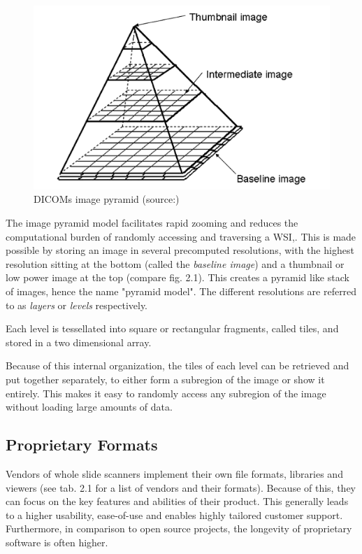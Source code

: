 \begin{figure}[H]
	\begin{center}
		\includegraphics[scale=0.2]{img/imgPyramid.png}
		\caption{DICOMs image pyramid (source:\cite{Singh11})}
		\label{fig:fig2.1}
	\end{center}
\end{figure}

The image pyramid model facilitates rapid zooming and reduces the computational burden of randomly accessing and traversing a WSI\cite{Singh11},\cite{Park12}. This is made possible by storing an image in several precomputed resolutions, with the highest resolution sitting at the bottom (called the \emph{baseline image}) and a thumbnail or low power image at the top (compare fig. 2.1)\cite{DICOM10}. This creates a pyramid like stack of images, hence the name "pyramid model". The different resolutions are referred to as \emph{layers}\cite{DICOM10} or \emph{levels}\cite{Singh11} respectively.

Each level is tessellated into square or rectangular fragments, called tiles, and stored in a two dimensional array\cite{Farahanil15}. 

Because of this internal organization, the tiles of each level can be retrieved and put together separately, to either form a subregion of the image or show it entirely. This makes it easy to randomly access any subregion of the image without loading large amounts of data\cite{Singh11}.


\subsection{Proprietary Formats}
Vendors of whole slide scanners implement their own file formats, libraries and viewers (see tab. 2.1 for a list of vendors and their formats). Because of this, they can focus on the key features and abilities of their product. This generally leads to a higher usability, ease-of-use and enables highly tailored customer support. Furthermore, in comparison to open source projects, the longevity of proprietary software is often higher\cite{Optimus15}.

